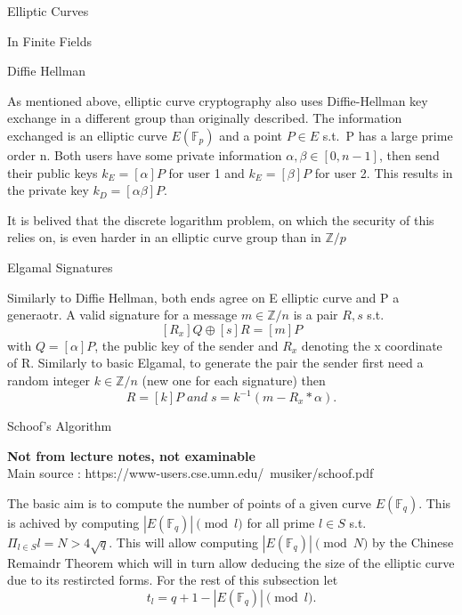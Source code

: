 \documentclass[12pt, letterpaper]{article}
\begin{document}
\begin{section}{Elliptic Curves}
\begin{subsection}{In Finite Fields}
    \begin{subsubsection}{Diffie Hellman}

      As mentioned above, elliptic curve cryptography also uses Diffie-Hellman
      key exchange in a different group than originally described. The
      information exchanged is an elliptic curve \(E(\mathbb{F}_{p})\) and a
      point \(P \in E\) s.t.\ P has a large prime order n. Both users have some
      private information \(\alpha, \beta \in [0, n - 1]\), then send their
      public keys \(k_{E} = [\alpha] P\) for user 1 and \(k_{E} = [\beta] P\)
      for user 2. This results in the private key \(k_{D} = [\alpha \beta] P\).

      It is belived that the discrete logarithm problem, on which the security
      of this relies on, is even harder in an elliptic curve group than in
      \(\mathbb{Z} / p\)

    \end{subsubsection}

    \begin{subsubsection}{Elgamal Signatures}

      Similarly to Diffie Hellman, both ends agree on E elliptic curve and P a
      generaotr. A valid signature for a message \(m \in \mathbb{Z} / n\) is a
      pair \(R, s\) s.t.\ \[[R_{x}] Q \oplus [s] R  = [m] P\] with
      \(Q = [\alpha] P \), the public key of the sender and \(R_{x}\) denoting
      the x coordinate of R. Similarly to basic Elgamal, to generate the pair
      the sender first need a random integer \(k \in \mathbb{Z} / n\) (new one
      for each signature) then
      \[R = [k] P \; and \; s = k^{-1}(m - R_{x} * \alpha).\]

    \end{subsubsection}

  \end{subsection}

  \begin{subsection}{Schoof's Algorithm}

    \textbf{Not from lecture notes, not examinable} \\
    Main source : https://www-users.cse.umn.edu/~musiker/schoof.pdf

    The basic aim is to compute the number of points of a given curve
    \(E(\mathbb{F}_{q})\). This is achived by computing \(| E(\mathbb{F}_{q}) |
    \pmod{l}\) for all prime \(l \in S\) s.t.\ \(\Pi_{l \in S}l = N > 4
    \sqrt{q}\). This will allow computing \(| E(\mathbb{F}_{q}) | \pmod{N}\) by
    the Chinese Remaindr Theorem which will in turn allow deducing the size of
    the elliptic curve due to its  restircted forms. For the rest of this
    subsection let \[t_{l} = q + 1  - | E(\mathbb{F}_{q}) | \pmod{l}.\]


\end{subsection}
\end{section}
\end{document}
